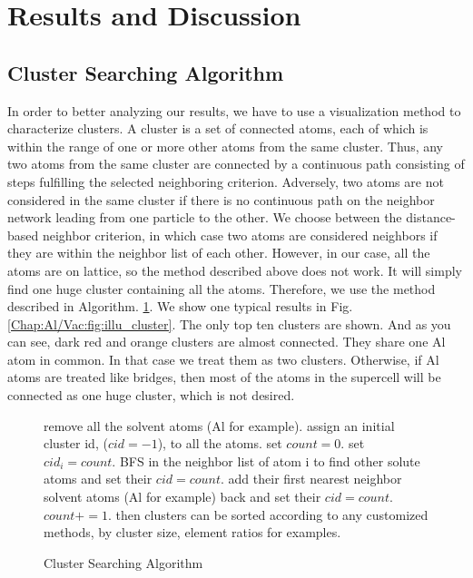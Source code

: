 \section{Results and Discussion}
\label{Chap:Al/Vac:section:RD}
\subsection{Cluster Searching Algorithm}

In order to better analyzing our results, we have to use a visualization method to characterize clusters. A cluster is a set of connected atoms, each of which is within the range of one or more other atoms from the same cluster. Thus, any two atoms from the same cluster are connected by a continuous path consisting of steps fulfilling the selected neighboring criterion. Adversely, two atoms are not considered in the same cluster if there is no continuous path on the neighbor network leading from one particle to the other. We choose between the distance-based neighbor criterion, in which case two atoms are considered neighbors if they are within the neighbor list of each other. However, in our case, all the atoms are on lattice, so the method described above does not work. It will simply find one huge cluster containing all the atoms. Therefore, we use the method described in Algorithm. \ref{algo:cluster}. We show one typical results in Fig. \ref{Chap:Al/Vac:fig:illu_cluster}. The only top ten clusters are shown. And as you can see, dark red and orange clusters are almost connected. They share one Al atom in common. In that case we treat them as two clusters. Otherwise, if Al atoms are treated like bridges, then most of the atoms in the supercell will be connected as one huge cluster, which is not desired.


\begin{figure}[!htb]
  \centering
  \begin{minipage}{.75\linewidth}
    \begin{algorithm}[H]
      \caption{Cluster Searching Algorithm}\label{algo:cluster}
      \begin{algorithmic}[1]
        \State remove all the solvent atoms (Al for example).
        \State assign an initial cluster id, ($cid = -1$), to all the atoms.
        \State set $count = 0$.
            \State set $cid_i = count$.
            \State \ac{BFS} in the neighbor list of atom i to find other solute atoms and set their $cid = count$.
            \State add their first nearest neighbor solvent atoms (Al for example) back and set their $cid = count$.
            \State $count += 1$.
          \EndIf
        \EndFor
        \State then clusters can be sorted according to any customized methods, by cluster size, element ratios for examples.
      \end{algorithmic}
    \end{algorithm}
  \end{minipage}
\end{figure}


